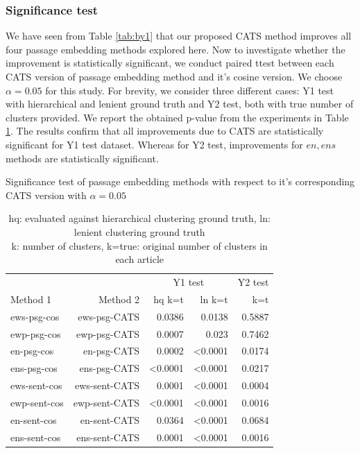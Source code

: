 \subsubsection{Significance test} We have seen from Table \ref{tab:by1} that our proposed CATS method improves all four passage embedding methods explored here. Now to investigate whether the improvement is statistically significant, we conduct paired ttest between each CATS version of passage embedding method and it's cosine version. We choose $\alpha = 0.05$ for this study. For brevity, we consider three different cases: Y1 test with hierarchical and lenient ground truth and Y2 test, both with true number of clusters provided. We report the obtained p-value from the experiments in Table \ref{tab:sigt}. The results confirm that all improvements due to CATS are statistically significant for Y1 test dataset. Whereas for Y2 test, improvements for $en, ens$ methods are statistically significant.
\begin{table}[t]
\centering
\caption{Significance test of passage embedding methods with respect to it's corresponding CATS version with $\alpha = 0.05$}
\label{tab:sigt}
\begin{tabular}{@{}lrrrr@{}}\toprule
&& \multicolumn{2}{c}{Y1 test} & Y2 test  \\
\cmidrule(r){3-4}
\cmidrule(r){5-5}
Method 1 & Method 2 & hq k=t & ln k=t & k=t \\\midrule
ews-psg-cos & ews-psg-CATS & 0.0386 & 0.0138 & 0.5887 \\ 
ewp-psg-cos & ewp-psg-CATS & 0.0007 & 0.023 & 0.7462 \\ 
en-psg-cos & en-psg-CATS & 0.0002 & <0.0001 & 0.0174 \\ 
ens-psg-cos & ens-psg-CATS & <0.0001 & <0.0001 & 0.0217 \\
ews-sent-cos & ews-sent-CATS & 0.0001 & <0.0001 & 0.0004 \\
ewp-sent-cos & ewp-sent-CATS & <0.0001 & <0.0001 & 0.0016 \\
en-sent-cos & en-sent-CATS & 0.0364 & <0.0001 & 0.0684 \\
ens-sent-cos & ens-sent-CATS & 0.0001 & <0.0001 & 0.0016 \\
\bottomrule
\end{tabular}
\caption*{hq: evaluated against hierarchical clustering ground truth, ln: lenient clustering ground truth\\
k: number of clusters, k=true: original number of clusters in each article}
\end{table}

